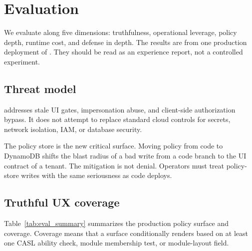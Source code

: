 \section{Evaluation}
\label{sec:evaluation}

We evaluate \uiPolicy{} along five dimensions: truthfulness, operational leverage, policy depth, runtime cost, and defense in depth. The results are from one production deployment of \system{}. They should be read as an experience report, not a controlled experiment.

\subsection{Threat model}
\label{sec:threat_model}

\uiPolicy{} addresses stale UI gates, impersonation abuse, and client-side authorization bypass. It does not attempt to replace standard cloud controls for secrets, network isolation, IAM, or database security.

The policy store is the new critical surface. Moving policy from code to DynamoDB shifts the blast radius of a bad write from a code branch to the UI contract of a tenant. The mitigation is not denial. Operators must treat policy-store writes with the same seriousness as code deploys.

\subsection{Truthful UX coverage}
\label{sec:truthful_coverage}

Table~\ref{tab:eval_summary} summarizes the production policy surface and coverage. Coverage means that a surface conditionally renders based on at least one CASL ability check, module membership test, or module-layout field.

